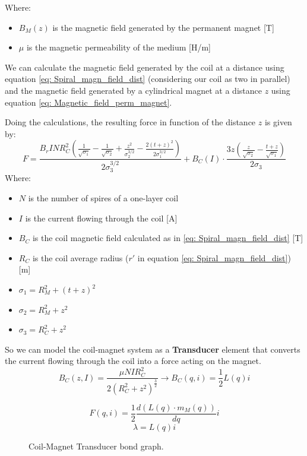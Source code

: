 Where:
\begin{itemize}
    \item $B_M(z)$ is the magnetic field generated by the permanent magnet [T]
    \item $\mu$ is the magnetic permeability of the medium [H/m]
\end{itemize}

We can calculate the magnetic field generated by the coil at a distance using equation \eqref{eq: Spiral_magn_field_dist} (considering our coil as two in parallel) and the magnetic field generated by a cylindrical magnet at a distance $z$ using equation \eqref{eq: Magnetic_field_perm_magnet}.

Doing the calculations, the resulting force in function of the distance $z$ is given by:
\begin{equation}
    F = \frac{ B_r I N R_C^2 \left(\frac{1}{\sqrt{\sigma_1}} - \frac{1}{\sqrt{\sigma_2}} + \frac{z^2}{\sigma_2^{3/2}} - \frac{2(t+z)^2}{2\sigma_1^{3/2}}\right)}{2\sigma_3^{3/2}} + B_C(I) \cdot \frac{3z \left(\frac{z}{\sqrt{\sigma_2}} - \frac{t+z}{\sqrt{\sigma_1}}\right)}{2\sigma_3}
\end{equation}
Where:
\begin{itemize}
    \item $N$ is the number of spires of a one-layer coil
    \item $I$ is the current flowing through the coil [A]
    \item $B_C$ is the coil magnetic field calculated as in \eqref{eq: Spiral_magn_field_dist} [T]
    \item $R_C$ is the coil average radius ($r'$ in equation \eqref{eq: Spiral_magn_field_dist}) [m]
    \item $\sigma_1 = R_M^2 + (t+z)^2$
    \item $\sigma_2 = R_M^2 + z^2$
    \item $\sigma_3 = R_C^2 + z^2$    
\end{itemize}

So we can model the coil-magnet system as a \textbf{Transducer} element that converts the current flowing through the coil into a force acting on the magnet.
\begin{equation}
    B_C(z, I) = \frac{\mu N I R_C^2}{2(R_C^2+z^2)^\frac{3}{2}} \rightarrow B_C(q, i) = \frac{1}{2} L(q) i
\end{equation}

\begin{figure}
    \centering
    \resizebox{.9\linewidth}{!}{}
    \caption{Coil-Magnet Transducer bond graph.}
    \label{fig: Coil-Magnet Transducer}
    \begin{equation}
        F(q, i) = \frac{1}{2} \frac{d \left(L(q) \cdot m_M(q) \right)}{dq} i
    \end{equation}
    \begin{equation}
        \lambda = L(q) i
    \end{equation}
\end{figure}
